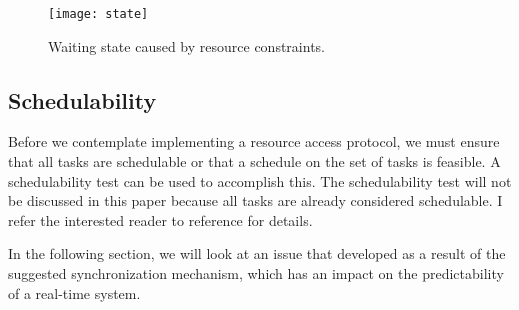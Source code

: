\begin{figure}[ht]
    \centering
    \texttt{[image: state]}
    \caption{Waiting state caused by resource constraints. \cite{b5}}
    \label{fig:state}
\end{figure}



\subsection{Schedulability}

Before we contemplate implementing a resource access protocol, we must ensure that all tasks are schedulable or that a schedule on the set of tasks is feasible. A schedulability test can be used to accomplish this. The schedulability test will not be discussed in this paper because all tasks are already considered schedulable. I refer the interested reader to reference \cite{b5} for details.

In the following section, we will look at an issue that developed as a result of the suggested synchronization mechanism, which has an impact on the predictability of a real-time system.